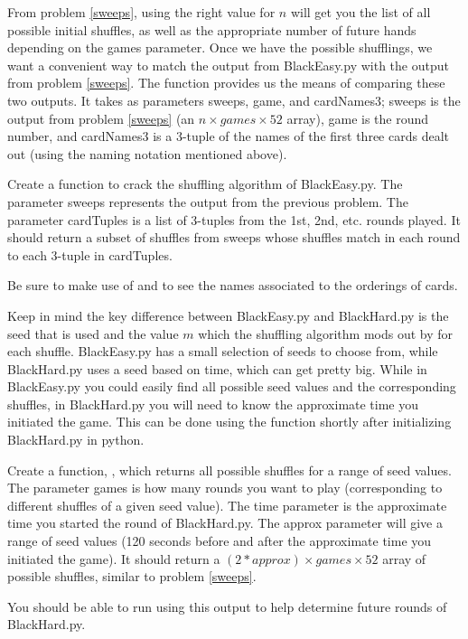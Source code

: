 From problem \ref{sweeps}, using the right value for $n$ will get you the list of all possible initial shuffles, as well as the appropriate number of future hands depending on the games parameter.
Once we have the possible shufflings, we want a convenient way to match the output from BlackEasy.py with the output from problem \ref{sweeps}.
The function  provides us the means of comparing these two outputs.
It takes as parameters sweeps, game, and cardNames3; sweeps is the output from problem \ref{sweeps} (an $n \times games \times 52$ array), game is the round number, and cardNames3 is a 3-tuple of the names of the first three cards dealt out (using the naming notation mentioned above).

\begin{problem}

Create a function  to crack the shuffling algorithm of BlackEasy.py.
The parameter sweeps represents the output from the previous problem.
The parameter cardTuples is a list of 3-tuples from the 1st, 2nd, etc. rounds played.
It should return a subset of shuffles from sweeps whose shuffles match in each round to each 3-tuple in cardTuples.

Be sure to make use of  and  to see the names associated to the orderings of cards.

\end{problem}

Keep in mind the key difference between BlackEasy.py and BlackHard.py is the seed that is used and the value $m$ which the shuffling algorithm mods out by for each shuffle.
BlackEasy.py has a small selection of seeds to choose from, while BlackHard.py uses a seed based on time, which can get pretty big.
While in BlackEasy.py you could easily find all possible seed values and the corresponding shuffles, in BlackHard.py you will need to know the approximate time you initiated the game.
This can be done using the  function shortly after initializing BlackHard.py in python.

\begin{problem}

Create a function, , which returns all possible shuffles for a range of seed values.
The parameter games is how many rounds you want to play (corresponding to different shuffles of a given seed value).
The time parameter is the approximate time you started the round of BlackHard.py.
The approx parameter will give a range of seed values (120 seconds before and after the approximate time you initiated the game).
It should return a $(2*approx) \times games \times 52$ array of possible shuffles, similar to problem \ref{sweeps}.

You should be able to run  using this output to help determine future rounds of BlackHard.py.

\end{problem}
